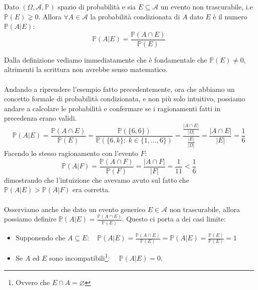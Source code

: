 \begin{definizione}
    Dato $(\Omega, \mathcal{A}, \mathbb{P})$ spazio di probabilità e sia $E\subseteq \mathcal{A}$ un evento non trascurabile, i.e $\mathbb{P}(E) \gneq 0$. Allora $\forall A\in\mathcal{A}$ la probabilità condizionata di $A$ dato $E$ è il numero $\mathbb{P}(A|E)$:
    \[\mathbb{P}(A|E) = \frac{\mathbb{P}(A\cap E)}{\mathbb{P}(E)}\]
\end{definizione}
Dalla definizione vediamo immediatamente che è fondamentale che $\mathbb{P}(E)\neq 0$, altrimenti la scrittura non avrebbe senso matematico.\\
\\
Andando a riprendere l'esempio fatto precedentemente, ora che abbiamo un concetto formale di probabilità condizionata, e non più solo intuitivo, possiamo andare a calcolare le probabilità e confermare se i ragionamenti fatti in precedenza erano validi. \\
\[\mathbb{P} (A|E) = \frac{\mathbb{P}(A\cap E)}{\mathbb{P}(E)} = \frac{\mathbb{P}(\{6, 6\})}{\mathbb{P}\left(\{6, k\}; \;k\in\{1, ..., 6\}\right)} = \frac{\frac{|A\cap E|}{|\Omega|}}{\frac{|E|}{|\Omega|}} = \frac{|A\cap E|}{|E|} = \frac{1}{6}\]
Facendo lo stesso ragionamento con l'evento $F$:
\[\mathbb{P}(A|F) = \frac{\mathbb{P}(A \cap F)}{\mathbb{P}(F)} = \frac{|A\cap F|}{|F|} = \frac{1}{11} < \frac{1}{6}\]
dimostrando che l'intuizione che avevamo avuto sul fatto che $\mathbb{P}(A |E) > \mathbb{P}(A|F)$ era corretta.\\
\\
Osserviamo anche che dato un evento generico $E\in\mathcal{A}$ non trascurabile, allora possiamo definire $\mathbb{P}(A|E) = \frac{\mathbb{P}(A\cap E)}{\mathbb{P}(E)}$. Questo ci porta a dei casi limite:
\begin{itemize}
    \item Supponendo che $A\subseteq E:\quad \mathbb{P}(A|E) = \frac{\mathbb{P}(A\cap E)}{\mathbb{P}(E)} = \mathbb{P}(A|E) = \frac{\mathbb{P}(E)}{\mathbb{P}(E)} = 1$
    \item Se $A \text{ ed }E$ sono incompatibili\footnote{Ovvero che $E\cap A=\varnothing$}: $\quad\mathbb{P}(A|E) = 0$.
\end{itemize}

